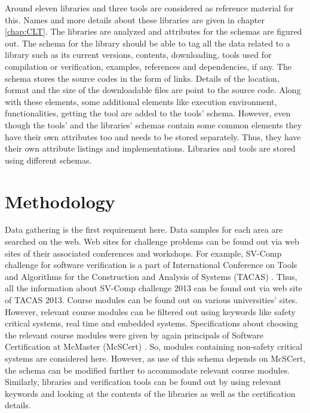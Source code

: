 \documentclass[11pt,letterpaper]{report}
\begin{document}
 Around eleven libraries and three tools are considered as reference material for this. Names and more details about these libraries are given in chapter \ref{chap:CLT}. The libraries are analyzed and attributes for the schemas are figured out. The schema for the library should be able to tag all the data related to a library such as its current versions, contents, downloading, tools used for compilation or verification, examples, references and dependencies, if any. The schema stores the source codes in the form of links. Details of the location, format and the size of the downloadable files are point to the source code. Along with these elements, some additional elements like execution environment, functionalities, getting the tool are added to the tools' schema. However, even though the tools' and the libraries' schemas contain some common elements they have their own attributes too and needs to be stored separately. Thus, they have their own attribute listings and implementations. Libraries and tools are stored using different schemas.  

\chapter{Methodology} 
Data gathering is the first requirement here. Data samples for each area are searched on the web. Web sites for challenge problems can be found out via web sites of their associated conferences and workshops. For example, SV-Comp challenge for software verification is a part of International Conference on Tools and Algorithms for the Construction and Analysis of Systems (TACAS) \cite{TACAS}. Thus, all the information about SV-Comp challenge 2013 can be found out via web site of TACAS 2013. Course modules can be found out on various universities' sites. However, relevant course modules can be filtered out using keywords like safety critical systems, real time and embedded systems. Specifications about choosing the relevant course modules were given by again principals of Software Certification at McMaster (McSCert) \cite{McCert}. So, modules containing non-safety critical systems are considered here. However, as use of this schema depends on McSCert, the schema can be modified further to accommodate relevant course modules.   Similarly, libraries and verification tools can be found out by using relevant keywords and looking at the contents of the libraries as well as the certification details. 
\end{document}
